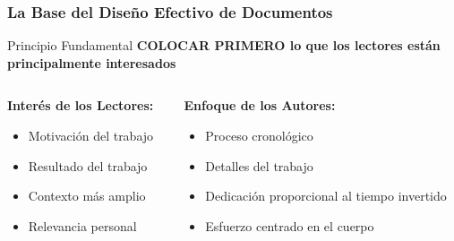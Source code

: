 \documentclass{beamer}
\begin{document}
\begin{frame}
\frametitle{La Base del Diseño Efectivo de Documentos}

\begin{block}{Principio Fundamental}
\textbf{COLOCAR PRIMERO lo que los lectores están principalmente interesados}
\end{block}

\begin{columns}[T]
\begin{column}{0.48\textwidth}
\textbf{Interés de los Lectores:}
\begin{itemize}
    \item Motivación del trabajo
    \item Resultado del trabajo
    \item Contexto más amplio
    \item Relevancia personal
\end{itemize}
\end{column}

\begin{column}{0.48\textwidth}
\textbf{Enfoque de los Autores:}
\begin{itemize}
    \item Proceso cronológico
    \item Detalles del trabajo
    \item Dedicación proporcional al tiempo invertido
    \item Esfuerzo centrado en el cuerpo
\end{itemize}
\end{column}
\end{columns}

\vspace{0.5cm}
\end{frame}
\end{document}
